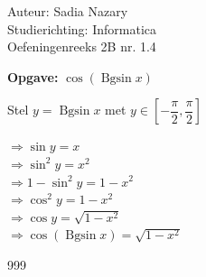 \documentclass[a4paper]{article}
\begin{document}
\noindent \large Auteur: Sadia Nazary \\
\noindent \large Studierichting: Informatica \\
\noindent \large Oefeningenreeks 2B nr. 1.4

\medskip

\normalsize

\textbf{Opgave:} $ \cos(\operatorname{Bgsin} x) $

Stel $y = \operatorname{Bgsin} x$ met $ y \in \left[ -\dfrac{\pi}{2}, \dfrac{\pi}{2} \right] $

$
\Rightarrow \sin y = x
$\\

$
\Rightarrow \sin^2 y = x^2
$\\

$
\Rightarrow 1 - \sin^2 y = 1 - x^2
$\\

$
\Rightarrow \cos^2 y = 1 - x^2
$\\

$
\Rightarrow \cos y = \sqrt{1 - x^2}
$\\

$
\Rightarrow \cos(\operatorname{Bgsin} x) = \sqrt{1 - x^2}
$\\

\begin{thebibliography}{999}
\end{thebibliography}
\end{document}
